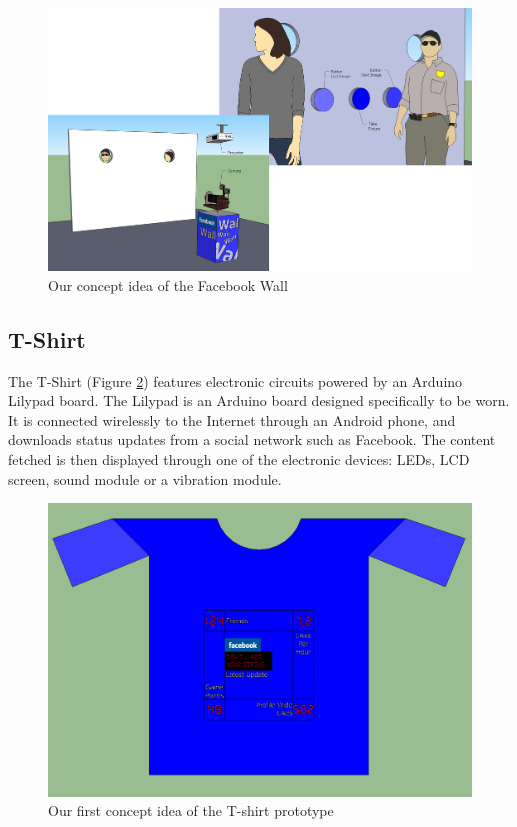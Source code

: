 \begin{figure}[h!]
\centering \includegraphics[scale=0.22]{img/prestudies-facebookwall}
\caption{Our concept idea of the Facebook Wall}
\label{fig:prestudies-facebookwall}
\end{figure}

\newpage

\subsection{T-Shirt}
The T-Shirt (Figure \ref{fig:prestudies-tshirt})  features electronic circuits powered by an Arduino Lilypad board.
The Lilypad is an Arduino board designed specifically to be worn. It is connected wirelessly to the Internet through
an Android phone, and downloads status updates from a social network such as Facebook.
The content fetched is then displayed through one of the electronic devices: LEDs, LCD screen,
sound module or a vibration module.


\begin{figure}[h!]
\centering \includegraphics[scale=0.35]{img/prestudies-tshirt}
\caption{Our first concept idea of the T-shirt prototype}
\label{fig:prestudies-tshirt}
\end{figure}

